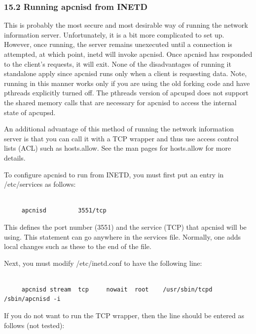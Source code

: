 \label{Running-apcnisd-from-INETD}

\subsubsection*{15.2 Running apcnisd from INETD}

This is probably the most secure and most desirable way of running the network
information server. Unfortunately, it is a bit more complicated to set up.
However, once running, the server remains unexecuted until a connection is
attempted, at which point, inetd will invoke apcnisd. Once apcnisd has
responded to the client's requests, it will exit. None of the disadvantages of
running it standalone apply since apcnisd runs only when a client is
requesting data. Note, running in this manner works only if you are using the
old forking code and have pthreads explicitly turned off. The pthreads version
of apcupsd does not support the shared memory calls that are necessary for
apcnisd to access the internal state of apcupsd.  

An additional advantage of this method of running the network information
server is that you can call it with a TCP wrapper and thus use access control
lists (ACL) such as hosts.allow. See the man pages for hosts.allow for more
details.  

To configure apcnisd to run from INETD, you must first put an entry in
/etc/services as follows: 

\footnotesize
\begin{verbatim}
     
     apcnisd         3551/tcp
\end{verbatim}
\normalsize

This defines the port number (3551) and the service (TCP) that apcnisd will be
using. This statement can go anywhere in the services file. Normally, one adds
local changes such as these to the end of the file.  

Next, you must modify /etc/inetd.conf to have the following line: 

\footnotesize
\begin{verbatim}
     
     apcnisd stream  tcp     nowait  root    /usr/sbin/tcpd  /sbin/apcnisd -i
\end{verbatim}
\normalsize

If you do not want to run the TCP wrapper, then the line should be entered as
follows (not tested): 

